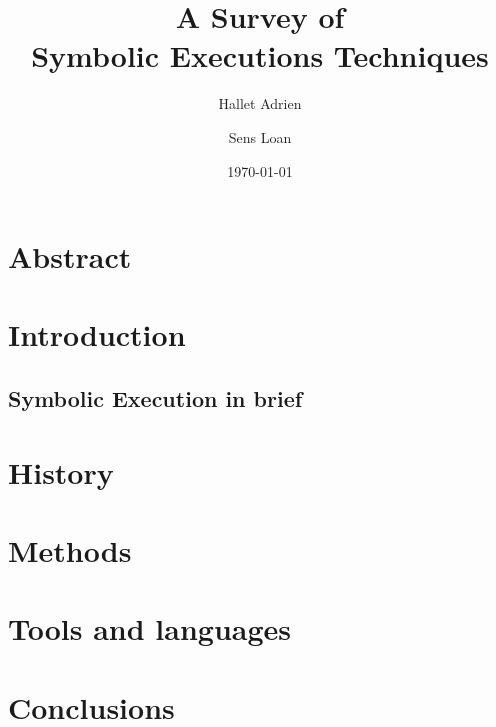 \documentclass[11pt]{article}
\begin{document}
\title{A Survey of\\Symbolic Executions Techniques} %
\author{Hallet Adrien \and Sens Loan}
\date{\today}
\maketitle

  \section*{Abstract}

  \section{Introduction}
    \subsection{Symbolic Execution in brief}

  \section{History}

  \section{Methods}

  \section{Tools and languages}

  \section{Conclusions}

{}

\end{document}
